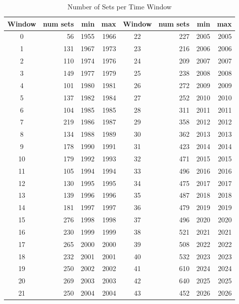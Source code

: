 \documentclass[11pt, letterpaper]{article}
\begin{document}
\begin{table}[h]
\centering
\caption{Number of Sets per Time Window}
\label{tab:sets_per_window}
\begin{tabular}{crrr@{\hspace{1.5em}}crrr}
\hline
\textbf{Window} & \textbf{num sets} & \textbf{min} & \textbf{max} & \textbf{Window} & \textbf{num sets} & \textbf{min} & \textbf{max} \\
\hline
0  & 56  & 1955 & 1966 & 22 & 227 & 2005 & 2005 \\
1  & 131 & 1967 & 1973 & 23 & 216 & 2006 & 2006 \\
2  & 110 & 1974 & 1976 & 24 & 209 & 2007 & 2007 \\
3  & 149 & 1977 & 1979 & 25 & 238 & 2008 & 2008 \\
4  & 101 & 1980 & 1981 & 26 & 272 & 2009 & 2009 \\
5  & 137 & 1982 & 1984 & 27 & 252 & 2010 & 2010 \\
6  & 104 & 1985 & 1985 & 28 & 311 & 2011 & 2011 \\
7  & 219 & 1986 & 1987 & 29 & 358 & 2012 & 2012 \\
8  & 134 & 1988 & 1989 & 30 & 362 & 2013 & 2013 \\
9  & 178 & 1990 & 1991 & 31 & 423 & 2014 & 2014 \\
10 & 179 & 1992 & 1993 & 32 & 471 & 2015 & 2015 \\
11 & 105 & 1994 & 1994 & 33 & 496 & 2016 & 2016 \\
12 & 130 & 1995 & 1995 & 34 & 475 & 2017 & 2017 \\
13 & 139 & 1996 & 1996 & 35 & 487 & 2018 & 2018 \\
14 & 181 & 1997 & 1997 & 36 & 479 & 2019 & 2019 \\
15 & 276 & 1998 & 1998 & 37 & 496 & 2020 & 2020 \\
16 & 230 & 1999 & 1999 & 38 & 521 & 2021 & 2021 \\
17 & 265 & 2000 & 2000 & 39 & 508 & 2022 & 2022 \\
18 & 232 & 2001 & 2001 & 40 & 532 & 2023 & 2023 \\
19 & 250 & 2002 & 2002 & 41 & 610 & 2024 & 2024 \\
20 & 269 & 2003 & 2003 & 42 & 640 & 2025 & 2025 \\
21 & 250 & 2004 & 2004 & 43 & 452 & 2026 & 2026 \\
\hline
\end{tabular}
\end{table}
\end{document}
